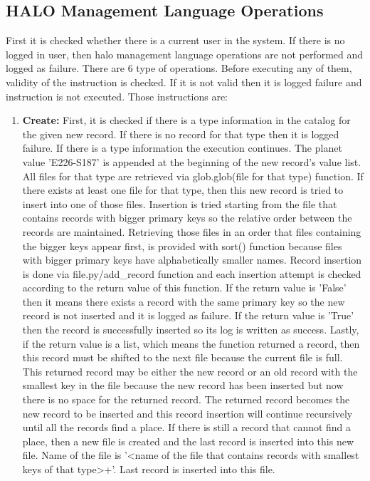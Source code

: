 \documentclass{article}
\begin{document}
\subsection{HALO Management Language Operations}
First it is checked whether there is a current user in the system. If there is no logged in user, then halo management language operations are not performed and logged as failure. There are 6 type of operations. Before executing any of them, validity of the instruction is checked. If it is not valid then it is logged failure and instruction is not executed. Those instructions are:
\begin{enumerate}
    \item \textbf{Create:} First, it is checked if there is a type information in the catalog for the given new record. If there is no record for that type then it is logged failure. If there is a type information the execution continues. The planet value 'E226-S187' is appended at the beginning of the new record's value list. All files for that type are retrieved via glob.glob(file for that type) function. If there exists at least one file for that type, then this new record is tried to insert into one of those files. Insertion is tried starting from the file that contains records with bigger primary keys so the relative order between the records are maintained. Retrieving those files in an order that files containing the bigger keys appear first, is provided with sort() function because files with bigger primary keys have alphabetically smaller names. Record insertion is done via file.py\slash add\_record function and each insertion attempt is checked according to the return value of this function. If the return value is 'False' then it means there exists a record with the same primary key so the new record is not inserted and it is logged as failure. If the return value is 'True' then the record is successfully inserted so its log is written as success. Lastly, if the return value is a list, which means the function returned a record, then this record must be shifted to the next file because the current file is full. This returned record may be either the new record or an old record with the smallest key in the file because the new record has been inserted but now there is no space for the returned record. The returned record becomes the new record to be inserted and this record insertion will continue recursively until all the records find a place. If there is still a record that cannot find a place, then a new file is created and the last record is inserted into this new file.  Name of the file is '\textless name of the file that contains records with smallest keys of that type\textgreater+'. Last record is inserted into this file. 

\end{enumerate}
\end{document}
